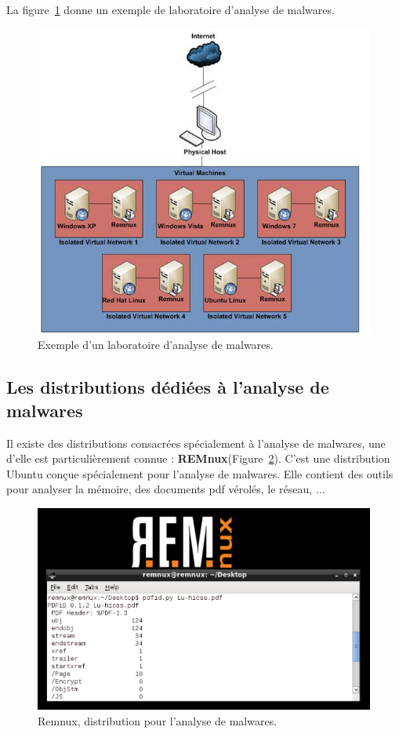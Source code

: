 La figure~\ref{fig :lab} donne un exemple de laboratoire d'analyse de malwares.
\begin{figure}[H]
\begin{center}
\includegraphics[scale=0.65]{Figures/lab.png}
\caption{Exemple d'un laboratoire d'analyse de malwares.}
\label{fig :lab} 
\end{center}
\end{figure}

\subsection{Les distributions dédiées à l'analyse de malwares}


Il existe des distributions consacrées spécialement à l'analyse de malwares, une d'elle est particulièrement connue : \textbf{REMnux}(Figure~\ref{fig :rem}). C'est une distribution Ubuntu conçue spécialement pour l'analyse de malwares. Elle contient des outils pour analyser la mémoire, des documents pdf vérolés, le réseau, ...\\
\begin{figure}[H]
\begin{center}
\includegraphics[scale=0.5]{Figures/remnux.png}
\caption{Remnux, distribution pour l'analyse de malwares.}
\label{fig :rem} 
\end{center}
\end{figure}


